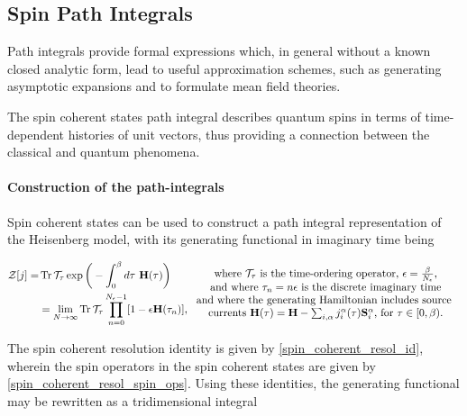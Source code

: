 \subsection{\textbf{Spin Path Integrals}}

Path integrals provide formal expressions which, in general without a known closed analytic form, lead to useful approximation schemes, such as generating asymptotic expansions and to formulate mean field theories. 

The spin coherent states path integral describes quantum spins in terms of time-dependent histories of unit vectors, thus providing a connection between the classical and quantum phenomena. \\

\paragraph{Construction of the path-integrals}

Spin coherent states can be used to construct a path integral representation of the Heisenberg model, with its generating functional in imaginary time being 

\begin{equation}
\begin{split}
    \mathcal{Z}[j] =& \Tr \mathcal{T}_{\tau} \exp \bigg(-\int_{0}^\beta d\tau \textnormal{ } {\bf H}(\tau)\bigg)  \\
    &= \lim_{N \rightarrow \infty} \Tr \mathcal{T}_{\tau} \prod_{n=0}^{N_{\epsilon} - 1} [1-\epsilon {\bf H}(\tau_n)],
\end{split} \begin{array}{cc}
         \textnormal{ where $\mathcal{T}_\tau$ is the time-ordering operator, $\epsilon = \frac{\beta}{N_{\epsilon}}$,}  \\
         \textnormal{  and where $\tau_n = n \epsilon$ is the discrete imaginary time} \\
         \textnormal{ and where the generating Hamiltonian includes source } \\
         \textnormal{ currents ${\bf H}(\tau) = {\bf H} - \sum_{i, \alpha} j_i^\alpha(\tau) {\bf S}_i^\alpha$, for $\tau \in [0, \beta).$}
    \end{array}
\end{equation}

The spin coherent resolution identity is given by \cref{spin_coherent_resol_id}, wherein the spin operators in the spin coherent states are given by \cref{spin_coherent_resol_spin_ops}. Using these identities, the generating functional may be rewritten as a tridimensional integral

